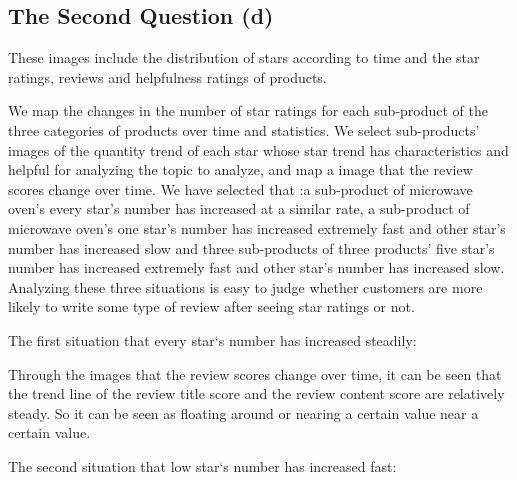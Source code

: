 \documentclass[12pt]{article}
\begin{document}
\subsection{The Second Question (d)}
\quad\par
These images include the distribution of stars according to time and the star ratings, reviews and helpfulness ratings of products.
\par
We map the changes in the number of star ratings for each sub-product of the three categories of products over time and statistics. We select sub-products’ images of the quantity trend of each star whose star trend has characteristics and helpful for analyzing the topic to analyze, and map a image that the review scores change over time. We have selected that :a sub-product of microwave oven’s every star’s number has increased at a similar rate, a sub-product of microwave oven’s one star’s number has increased extremely fast and other star’s number has increased slow and three sub-products of three products’ five star’s number has increased extremely fast and other star’s number has increased slow. Analyzing these three situations is easy to judge whether customers are more likely to write some type of review after seeing star ratings or not. 
\par
The first situation that every star`s number has increased steadily:
\par\quad\par\quad\par\quad\par\quad\par\quad\par\quad\par\quad\par\quad\par\quad\par\quad\par
Through the images that the review scores change over time, it can be seen that the trend line of the review title score and the review content score are relatively steady. So it can be seen as floating around or nearing a certain value near a certain value.
\par
The second situation that low star`s number has increased fast:
\par\quad\par\quad\par\quad\par\quad\par\quad\par\quad\par\quad\par\quad\par\quad\par\quad\par
\end{document}

